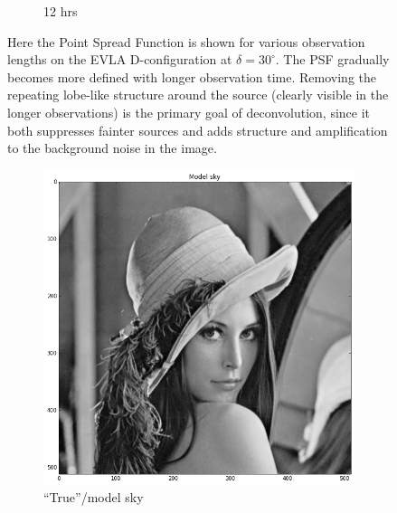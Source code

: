 \begin{figure}[h]
\begin{mdframed}
\begin{subfigure}[b]{0.24\textwidth}
  \caption{12 hrs}
 \end{subfigure}
 \caption[EVLA Point Spread Function evolution]{Here the Point Spread Function is shown for various observation lengths on the EVLA D-configuration at $\delta=30^\circ$. The PSF gradually 
 becomes more defined with longer observation time. Removing the repeating lobe-like structure around the source (clearly visible in the longer observations) is the primary goal of 
 deconvolution, since it both suppresses fainter sources and adds structure and amplification to the background noise in the image.}
  \label{fig_psf}
 \end{mdframed}
\end{figure}

\begin{figure}[ht!]
 \begin{mdframed}
 \centering
 \begin{subfigure}[b]{0.39\textwidth}
  \includegraphics[width=\textwidth]{images/evla_lena_observation/model.png}
  \caption{``True''/model sky}
 \end{subfigure}
 \begin{subfigure}[b]{0.39\textwidth}

\end{subfigure}
\end{mdframed}
\end{figure}

